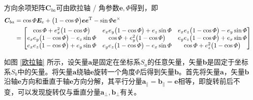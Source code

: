 方向余项矩阵$\bm{C}_{ba}$可由欧拉轴 / 角参数$\bm{e}, \varPhi$得到，即
\begin{align}
	\bm{C}_{ba} 
	& = \cos \varPhi \bm{E}_e + \big( 1 - \cos \varPhi \big) \bm{e} \bm{e}^{\text{T}} - \sin \varPhi \bm{e}^{\times} \notag \\
	& = 
	\begin{bmatrix}
		\cos \varPhi + e_x^2 \big( 1 - \cos \varPhi \big) & e_x e_y \big( 1 - \cos \varPhi \big) + e_z \sin \varPhi & e_x e_z \big( 1 - \cos \varPhi \big) - e_y \sin \varPhi \\
		e_x e_y \big( 1 - \cos \varPhi \big) - e_z \sin \varPhi & \cos \varPhi + e_y^2 \big( 1 - \cos \varPhi \big) & e_y e_z \big(1 - \cos \varPhi \big) + e_x \sin \varPhi \\
		e_x e_z \big( 1 - \cos \varPhi \big) + e_y \sin \varPhi & e_y e_z \big( 1- \cos \varPhi \big) - e_x \sin \varPhi & \cos \varPhi + e_z^2 \big( 1- \cos \varPhi \big)
	\end{bmatrix}
\end{align}
\clearpage
\vspace*{-3em}

\proof 如图 \ref{欧拉轴} 所示，设矢量$\bm{a}$是固定在坐标系$S_a$的任意矢量，矢量$\bm{b}$是固定于坐标系$S_b$中的矢量。将矢量$\bm{a}$绕轴$\bm{e}$旋转一个角度$\varPhi$后得到矢量$\bm{b}$。首先将矢量$\bm{a}$，矢量$\bm{b}$沿轴$\bm{e}$方向和垂直于轴$\bm{e}$方向分解，其平行分量$\bm{a}_{\parallel} = \bm{b}_{\parallel} = \bm{e}$相等，即旋转前后不变，可以发现旋转仅与垂直分量$\bm{a}_{\perp}, \bm{b}_{\perp}$有关。

